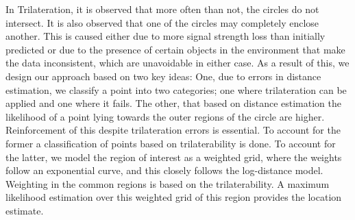 \documentclass[twocolumn, 11pt]{IEEEtran}
\begin{document}
In Trilateration, it is observed that more often than not, the circles do not intersect. It is also observed that one of the circles may completely enclose another. This is caused either due to more signal strength loss than initially predicted or due to the presence of certain objects in the environment that make the data inconsistent, which are unavoidable in either case. As a result of this, we design our approach based on two key ideas: One, due to errors in distance estimation, we classify a point into two categories; one where trilateration can be applied and one where it fails. The other, that based on distance estimation the likelihood of a point lying towards the outer regions of the circle are higher. Reinforcement of this despite trilateration errors is essential. To account for the former a classification of points based on trilaterability is done. To account for the latter, we model the region of interest as a weighted grid, where the weights follow an exponential curve, and this closely follows the log-distance model. Weighting in the common regions is based on the trilaterability. A maximum likelihood estimation over this weighted grid of this region provides the location estimate.





\end{document}
